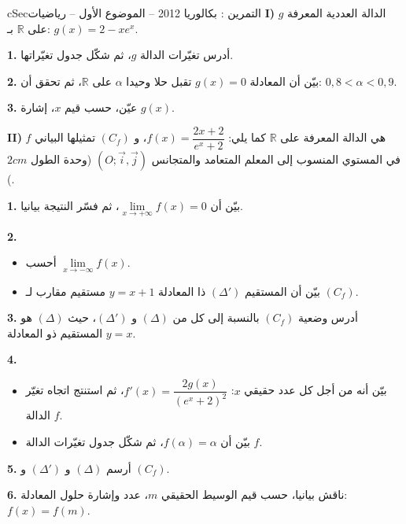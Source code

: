 \documentclass[12pt,a4paper]{article}
\newenvironment{BOX}[2]{\begin{otherlanguage}{english}\begin{arbox}{#1}{#2}}{\end{arbox}\end{otherlanguage}}
\newcounter{exo}
\newenvironment{tamrin}[1]{\stepcounter{exo}\begin{BOX}{cSec}{التمرين \theexo: #1}}{\end{BOX}}
\newcommand{\R}{\mathbb{R}}
\newenvironment{sq}{\begin{itemize}[leftmargin=2.4em,itemsep=3pt]}{\end{itemize}}
\newcommand{\qa}{\item[(أ)]}\newcommand{\qb}{\item[(ب)]}\newcommand{\qc}{\item[(جـ)]}\newcommand{\qd}{\item[(د)]}\newcommand{\qe}{\item[(هـ)]}
\newcommand{\QQ}[1]{\par\smallskip\textbf{#1.} }
\begin{document}
\begin{tamrin}{بكالوريا 2012 -- الموضوع الأول -- رياضيات}
\textbf{I)} $g$ الدالة العددية المعرفة على $\R$ بـ: $g(x)=2-xe^{x}$.
\QQ{1} أدرس تغيّرات الدالة $g$، ثم شكّل جدول تغيّراتها.
\QQ{2} بيّن أن المعادلة $g(x)=0$ تقبل حلا وحيدا $\alpha$ على $\R$، ثم تحقق أن: $0{,}8<\alpha<0{,}9$.
\QQ{3} عيّن، حسب قيم $x$، إشارة $g(x)$.

\textbf{II)} $f$ هي الدالة المعرفة على $\R$ كما يلي: $f(x)=\dfrac{2x+2}{e^{x}+2}$،
و $(C_f)$ تمثيلها البياني في المستوي المنسوب إلى المعلم المتعامد والمتجانس $(O;\vec i,\vec j)$ (وحدة الطول $2cm$).
\QQ{1} بيّن أن $\lim\limits_{x\to+\infty}f(x)=0$، ثم فسّر النتيجة بيانيا.
\QQ{2}
\begin{sq}
\qa أحسب $\lim\limits_{x\to-\infty}f(x)$.
\qb بيّن أن المستقيم $(\Delta')$ ذا المعادلة $y=x+1$ مستقيم مقارب لـ $(C_f)$.
\end{sq}
\QQ{3} أدرس وضعية $(C_f)$ بالنسبة إلى كل من $(\Delta)$ و $(\Delta')$، حيث $(\Delta)$ هو المستقيم ذو المعادلة $y=x$.
\QQ{4}
\begin{sq}
\qa بيّن أنه من أجل كل عدد حقيقي $x$: $f'(x)=\dfrac{2g(x)}{(e^{x}+2)^2}$، ثم استنتج اتجاه تغيّر الدالة $f$.
\qb بيّن أن $f(\alpha)=\alpha$، ثم شكّل جدول تغيّرات الدالة $f$.
\end{sq}
\QQ{5} أرسم $(\Delta)$ و $(\Delta')$ و $(C_f)$.
\QQ{6} ناقش بيانيا، حسب قيم الوسيط الحقيقي $m$، عدد وإشارة حلول المعادلة: $f(x)=f(m)$.
\end{tamrin}
\end{document}
